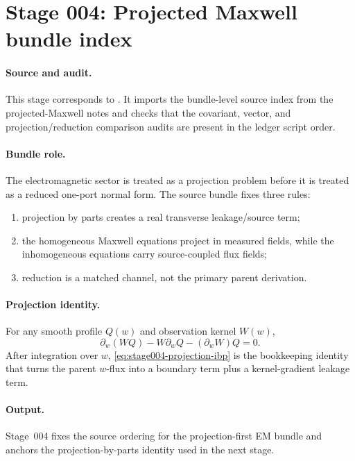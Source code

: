\section[Stage 004]{Stage 004: Projected Maxwell bundle index}
\label{stage:004}


\paragraph{Source and audit.}
This stage corresponds to
.
It imports the bundle-level source index from the projected-Maxwell notes and
checks that the covariant, vector, and projection/reduction comparison audits
are present in the ledger script order.

\paragraph{Bundle role.}
The electromagnetic sector is treated as a projection problem before it is
treated as a reduced one-port normal form.  The source bundle fixes three
rules:
\begin{enumerate}
\item projection by parts creates a real transverse leakage/source term;
\item the homogeneous Maxwell equations project in measured fields, while the
inhomogeneous equations carry source-coupled flux fields;
\item reduction is a matched channel, not the primary parent derivation.
\end{enumerate}

\paragraph{Projection identity.}
For any smooth profile \(Q(w)\) and observation kernel \(W(w)\),
\begin{equation}
\label{eq:stage004-projection-ibp}
\partial_w(WQ)-W\partial_wQ-(\partial_wW)Q=0.
\end{equation}
After integration over \(w\), \eqref{eq:stage004-projection-ibp} is the
bookkeeping identity that turns the parent \(w\)-flux into a boundary term
plus a kernel-gradient leakage term.

\paragraph{Output.}
Stage~004 fixes the source ordering for the projection-first EM bundle and
anchors the projection-by-parts identity used in the next stage.
